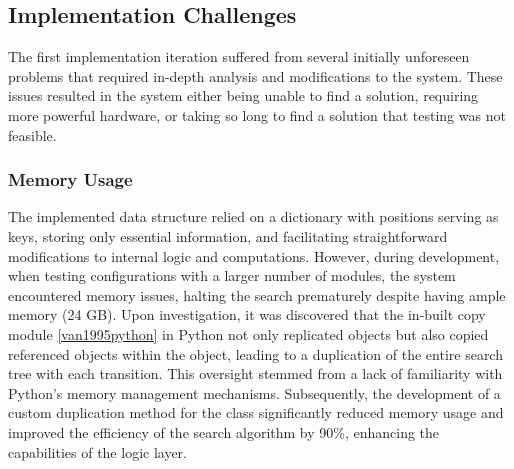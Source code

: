 \subsection{Implementation Challenges}
The first implementation iteration suffered from several initially unforeseen problems that required in-depth analysis and modifications to the system. These issues resulted in the system either being unable to find a solution, requiring more powerful hardware, or taking so long to find a solution that testing was not feasible.

\subsubsection{Memory Usage}
The implemented data structure relied on a dictionary with positions serving as keys, storing only essential information, and facilitating straightforward modifications to internal logic and computations. However, during development, when testing configurations with a larger number of modules, the system encountered memory issues, halting the search prematurely despite having ample memory (24 GB). Upon investigation, it was discovered that the in-built copy module \ref{van1995python} in Python not only replicated objects but also copied referenced objects within the object, leading to a duplication of the entire search tree with each transition. This oversight stemmed from a lack of familiarity with Python's memory management mechanisms. Subsequently, the development of a custom duplication method for the class significantly reduced memory usage and improved the efficiency of the search algorithm by 90\%, enhancing the capabilities of the logic layer.

